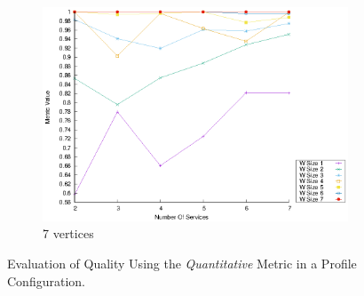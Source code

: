 \begin{figure}[!htb]
\begin{subfigure}{0.33\textwidth}
    \includegraphics[width=\textwidth]{Images/graphs/window_quality_performance_diff_perce_n7_s7_20_100_n7}
    \caption{7 vertices}
    \label{fig:quality_window_perce_wide_7n}
  \end{subfigure}
  \caption{Evaluation of Quality Using the \emph{Quantitative} Metric in a \wide Profile Configuration.}  \label{fig:quality_window_perce_wide}
\end{figure}


